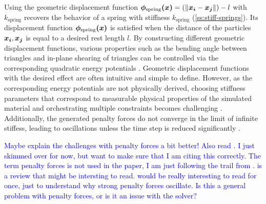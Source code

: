 Using the geometric displacement function $\bm{\phi_{\text{spring}}(x)} = (\lVert \bm{x_i} - \bm{x_j} \rVert) - l$ with $k_{\text{spring}}$ 
recovers the behavior of a spring with stiffness $k_{\text{spring}}$ (\cref{ss:stiff-springs}). Its displacement function 
$\bm{\phi_{\text{spring}}(x)}$ is satisfied when the distance of the particles $\bm{x_i}, \bm{x_j}$ is equal to a desired rest length $l$. 
By constructing different geometric displacement functions, various properties such as the bending angle between triangles and in-plane 
shearing of triangles can be controlled via the corresponding quadratic energy potentials \cite{baraff1998}. Geometric displacement 
functions with the desired effect are often intuitive and simple to define. However, as the corresponding energy potentials are not physically 
derived, choosing stiffness parameters that correspond to measurable physical properties of the simulated material and orchestrating 
multiple constraints becomes challenging \cite{servin2006, nealen2006}. Additionally, the generated penalty forces do not converge in the 
limit of infinite stiffess, leading to oscillations unless the time step is reduced significantly \cite{rubin1957}.

\textcolor{blue}{Maybe explain the challenges with penalty forces a bit better! Also read \cite{terz1987, nealen2006, rubin1957}. 
I just skimmed over \cite{terz1987} for now, but want to make sure that I am citing this correctly. The term penalty forces is not used
in the paper, I am just following the trail from \cite{servin2006}. \cite{nealen2006} is a review that might be intersting to read.
\cite{rubin1957} would be really interesting to read for once, just to understand why strong penalty forces oscillate. Is this a
general problem with penalty forces, or is it an issue with the solver?}

